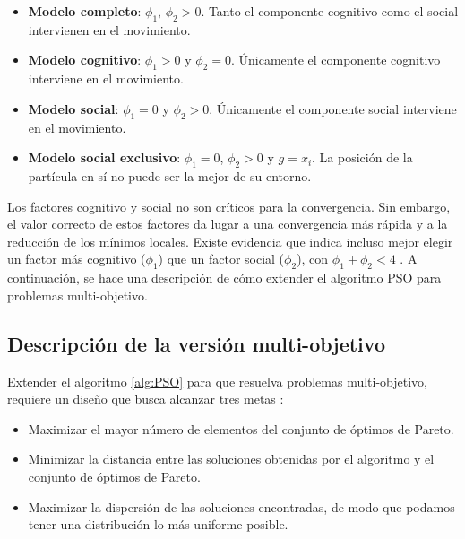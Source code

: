     \begin{itemize}
     \item \textbf{Modelo completo}: $\phi_1$, $\phi_2 > 0$. Tanto el componente cognitivo como el social intervienen en el movimiento.
     \item \textbf{Modelo cognitivo}: $\phi_1 > 0$ y $\phi_2 = 0$. \'Unicamente el componente cognitivo interviene en el movimiento.
     \item \textbf{Modelo social}: $\phi_1 = 0$ y $\phi_2 > 0$. \'Unicamente el componente social interviene en el movimiento.
     \item \textbf{Modelo social exclusivo}: $\phi_1 = 0$, $\phi_2 > 0$ y $g = x_i$. La posici\'on de la part\'icula en s\'i no puede 
     ser la mejor de su entorno.

    \end{itemize}

    Los factores cognitivo y social no son cr\'iticos para la convergencia. Sin embargo, el valor correcto de estos 
    factores da lugar a una convergencia m\'as r\'apida y a la reducci\'on de los m\'inimos locales. Existe evidencia 
    que indica incluso mejor elegir un factor m\'as cognitivo ($\phi_1$) que un factor social ($\phi_2$), con $\phi_1 + \phi_2 < 4$ 
    \cite{Maurice11}. A continuaci\'on, se hace una descripci\'on de c\'omo extender el algoritmo PSO para problemas multi-objetivo.
    
  \subsection{Descripci\'on de la versi\'on multi-objetivo}
  
  Extender el algoritmo \ref{alg:PSO} para que resuelva problemas multi-objetivo, requiere un dise\~no que busca alcanzar tres metas
  \cite{Nik11}:
  
  \begin{itemize}
   \item Maximizar el mayor n\'umero de elementos del conjunto de \'optimos de Pareto.
   \item Minimizar la distancia entre las soluciones obtenidas por el algoritmo y el conjunto de \'optimos de Pareto.
   \item Maximizar la dispersi\'on de las soluciones encontradas, de modo que podamos tener una distribuci\'on lo m\'as 
	uniforme posible.
  \end{itemize}

